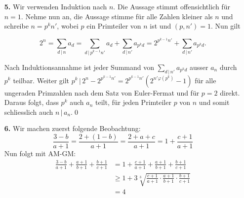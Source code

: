 \documentclass[12pt,a4paper]{article}
\theoremstyle{plain}
\theoremstyle{definition}
\renewcommand{\phi}{\varphi} %
\renewcommand{\div}{\, | \,}
\begin{document}
\begin{itemize}
\item[\textbf{5.}]
Wir verwenden Induktion nach $n$. Die Aussage stimmt offensichtlich für $n=1$.
Nehme nun an, die Aussage stimme für alle Zahlen kleiner als $n$ und schreibe $n=p^kn'$,
wobei $p$ ein Primteiler von $n$ ist und $(p,n')=1$. Nun gilt

\[2^n=\sum_{d\div n}a_d = \sum_{d\div p^{k-1}n'} a_d + \sum_{d\div n'}a_{p^kd} =2^{p^{k-1}n'}+\sum_{d\div n'}a_{p^kd}.\]

Nach Induktionsannahme ist jeder Summand von $\sum_{d\div n'}a_{p^kd}$ ausser $a_n$ durch $p^k$ teilbar.
Weiter gilt $p^k\div 2^n - 2^{p^{k-1}n'} = 2^{p^{k-1}n'}(2^{n'\phi(p^k)}-1)$ für alle ungeraden Primzahlen nach dem 
Satz von Euler-Fermat und für $p=2$ direkt. Daraus folgt, dass $p^k$ auch $a_n$ teilt, für jeden Primteiler $p$ von $n$
und somit schliesslich auch $n\div a_n$.\qed

\item[\textbf{6.}]
Wir machen zuerst folgende Beobachtung:
\[\frac{3-b}{a+1}=\frac{2+(1-b)}{a+1}=\frac{2+a+c}{a+1}=1+\frac{c+1}{a+1}\]
Nun folgt mit AM-GM:
\begin{align*}
\frac{3-b}{a+1}+\frac{a+1}{b+1}+\frac{b+1}{c+1}&=1+\frac{c+1}{a+1}+\frac{a+1}{b+1}+\frac{b+1}{c+1}\\
&\geq1+3\sqrt[3]{\frac{c+1}{a+1}\cdot\frac{a+1}{b+1}\cdot\frac{b+1}{c+1}}\\
&=4
\end{align*}
\qedhere


\end{itemize}
\end{document}
